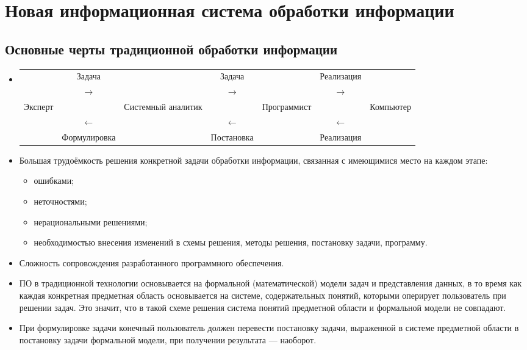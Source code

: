 \documentclass[a4paper,12pt]{report}
\begin{document}
\section{Новая информационная система обработки информации}


\subsection{Основные черты традиционной обработки информации}

	\begin{itemize}
		\item
			\begin{tabular}{ p{2cm} | c | p{2cm} | c | p{2.4cm} | c | p{2cm} }
				& Задача        & & Задача        & & Реализация    & \\
				& $\rightarrow$ & & $\rightarrow$ & & $\rightarrow$ & \\
				\hline
				Эксперт & & Системный аналитик & & Программист & & Компьютер \\
				\hline
				& $\leftarrow$ & & $\leftarrow$ & & $\leftarrow$ & \\
				& Формулировка & & Постановка   & & Реализация   & \\
			\end{tabular}
		\item Большая трудоёмкость решения конкретной задачи обработки информации,
			связанная с имеющимися место на каждом этапе:
			\begin{itemize}
				\item ошибками;
				\item неточностями;
				\item нерациональными решениями;
				\item необходимостью внесения изменений в схемы решения,
					методы решения, постановку задачи, программу.
			\end{itemize}
		\item Сложность сопровождения разработанного программного обеспечения.
		\item ПО в традиционной технологии основывается на формальной
			(математической) модели задач и представления данных, в то время как
			каждая конкретная предметная область основывается на системе,
			содержательных понятий, которыми оперирует пользователь при решении
			задач. Это значит, что в такой схеме решения система понятий предметной
			области и формальной модели не совпадают.
		\item При формулировке задачи конечный пользователь должен перевести
			постановку задачи, выраженной в системе предметной области в постановку
			задачи формальной модели, при получении результата — наоборот.
	\end{itemize}
\end{document}
